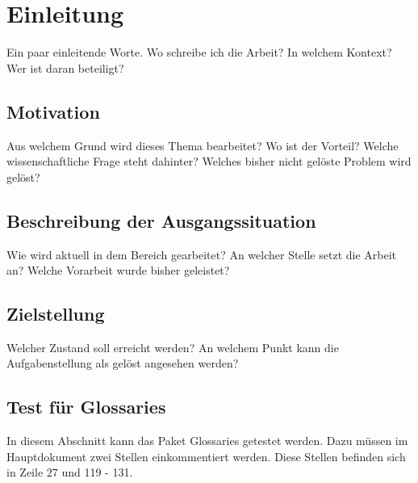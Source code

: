 


\section{Einleitung}

Ein paar einleitende Worte. Wo schreibe ich die Arbeit? In welchem Kontext? Wer ist daran beteiligt?


	\subsection{Motivation}
	
	Aus welchem Grund wird dieses Thema bearbeitet? Wo ist der Vorteil? Welche wissenschaftliche Frage steht dahinter? Welches bisher nicht gelöste Problem wird gelöst?
	

	\subsection{Beschreibung der Ausgangssituation}
	
	Wie wird aktuell in dem Bereich gearbeitet? An welcher Stelle setzt die Arbeit an? Welche Vorarbeit wurde bisher geleistet?
	
	
	\subsection{Zielstellung} \label{sec:Zielstellung}
	
	Welcher Zustand soll erreicht werden? An welchem Punkt kann die Aufgabenstellung als gelöst angesehen werden?
	
	
	
	
	
	
	
	\subsection{Test für Glossaries}
	
	In diesem Abschnitt kann das Paket Glossaries getestet werden. Dazu müssen im Hauptdokument zwei Stellen einkommentiert werden. Diese Stellen befinden sich in Zeile 27 und 119 - 131.
	
